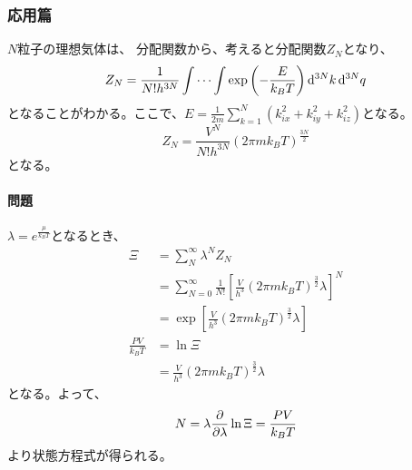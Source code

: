 \documentclass[titlepage]{ltjsarticle}
\begin{document}
\subsubsection*{応用篇}
\(N\)粒子の理想気体は、
分配関数から、考えると分配関数\(Z_N\)となり、
\begin{equation}
  Z_N = \frac{1}{N!h^{3N}} \int \cdots \int \exp \left( - \frac{E}{k_BT} \right) \odif[order=3N]{k} \odif[order=3N]{q}
\end{equation}
となることがわかる。ここで、\(E = \frac{1}{2m}\sum^{N}_{k=1}(k^2_{ix}+k^2_{iy}+k^2_{iz})\)となる。
\begin{equation}\label{eq:0.3}
  Z_N = \frac{V^N}{N!h^{3N}} \left( 2 \pi m k_BT \right)^{\frac{3N}{2}}
\end{equation}
となる。


\paragraph{問題}
\(\lambda=e^{\frac{\mu}{k_BT}}\)となるとき、
\begin{align}
  \Xi &= \sum_N^{\infty} \lambda^{N} Z_N \\
      & = \sum_{N=0}^{\infty}\frac{1}{N!} \left[ \frac{V}{h^3}(2\pi m k_BT )^{\frac{3}{2}}\lambda \right]^N \\
      & = \exp \left[ \frac{V}{h^3}(2\pi m k_BT )^{\frac{3}{2}}\lambda \right]\\
      \frac{PV}{k_BT} & = \ln \Xi \\
      & = \frac{V}{h^3}(2 \pi m k_B T)^{\frac{3}{2}}\lambda
\end{align}
となる。よって、
\begin{equation}
  N = \lambda \pdv{}{\lambda} \ln \Xi = \frac{PV}{k_BT}  
\end{equation}
より状態方程式が得られる。
\end{document}
